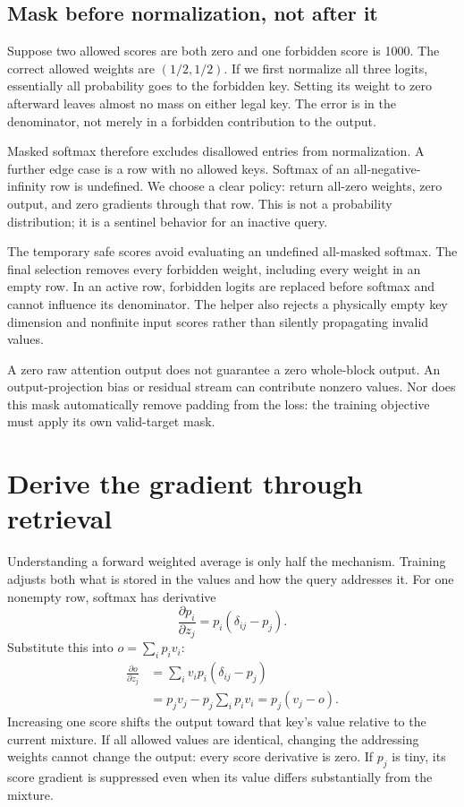 \subsection{Mask before normalization, not after it}

Suppose two allowed scores are both zero and one forbidden score is 1000. The correct allowed weights are $(1/2,1/2)$. If we first normalize all three logits, essentially all probability goes to the forbidden key. Setting its weight to zero afterward leaves almost no mass on either legal key. The error is in the denominator, not merely in a forbidden contribution to the output.

Masked softmax therefore excludes disallowed entries from normalization. A further edge case is a row with no allowed keys. Softmax of an all-negative-infinity row is undefined. We choose a clear policy: return all-zero weights, zero output, and zero gradients through that row. This is not a probability distribution; it is a sentinel behavior for an inactive query.


The temporary safe scores avoid evaluating an undefined all-masked softmax. The final selection removes every forbidden weight, including every weight in an empty row. In an active row, forbidden logits are replaced before softmax and cannot influence its denominator. The helper also rejects a physically empty key dimension and nonfinite input scores rather than silently propagating invalid values.


A zero raw attention output does not guarantee a zero whole-block output. An output-projection bias or residual stream can contribute nonzero values. Nor does this mask automatically remove padding from the loss: the training objective must apply its own valid-target mask.

\section{Derive the gradient through retrieval}

Understanding a forward weighted average is only half the mechanism. Training adjusts both what is stored in the values and how the query addresses it. For one nonempty row, softmax has derivative
\begin{equation}
\frac{\partial p_i}{\partial z_j}=p_i(\delta_{ij}-p_j).
\end{equation}
Substitute this into $o=\sum_i p_iv_i$:
\begin{align}
\frac{\partial o}{\partial z_j}
&=\sum_i v_ip_i(\delta_{ij}-p_j)\\
&=p_jv_j-p_j\sum_i p_iv_i
=p_j(v_j-o).
\label{eq:gradient}
\end{align}
Increasing one score shifts the output toward that key's value relative to the current mixture. If all allowed values are identical, changing the addressing weights cannot change the output: every score derivative is zero. If $p_j$ is tiny, its score gradient is suppressed even when its value differs substantially from the mixture.


